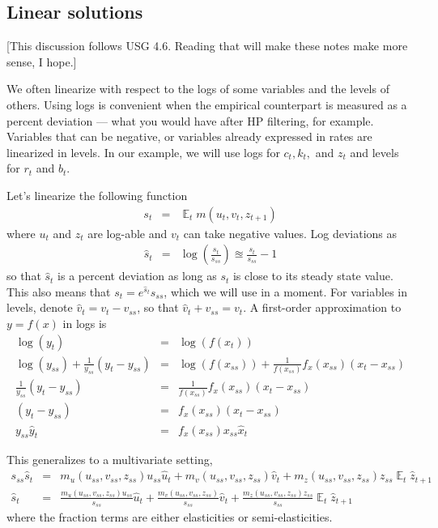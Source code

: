 \documentclass[11pt,pdftex,twoside,letterpaper]{exam}
\DeclareMathOperator{\EX}{\mathbb{E}}%
\begin{document}
\subsection{Linear solutions}
[This discussion follows USG 4.6. Reading that will make these notes make more sense, I hope.]

We often linearize with respect to the logs of some variables and the levels of others. Using logs is convenient when the empirical counterpart is measured as a percent deviation --- what you would have after HP filtering, for example. Variables that can be negative, or variables already expressed in rates are linearized in levels. In our example, we will use logs for $c_t, k_t,$ and  $z_t$ and levels for $r_t$ and $b_t$.

Let's linearize the following function
\begin{eqnarray}
  s_t &=& \EX_t m(u_t, v_t, z_{t+1}) \label{eq:tolin}
\end{eqnarray}
where $u_t$ and $z_t$ are log-able and $v_t$ can take negative values. Log deviations as
\begin{eqnarray}
  \hat{s}_t &=& \log\left(\frac{s_t}{s_{ss}}\right)\approxeq\frac{s_t}{s_{ss}}-1
\end{eqnarray}
so that $\hat{s}_t$ is a percent deviation as long as $s_t$ is close to its steady state value. This also means that $s_t=e^{\hat{s}_t}s_{ss}$, which we will use in a moment. For variables in levels, denote $\hat{v}_t=v_t-v_{ss}$, so that $\hat{v}_t+v_{ss}=v_t$. A first-order approximation to $y=f(x)$ in logs is
\begin{eqnarray}
  \log(y_t) &=& \log(f(x_t))\\
  \log(y_{ss})+\frac{1}{y_{ss}}(y_t-y_{ss})&=&\log(f(x_{ss}))+\frac{1}{f(x_{ss})}f_x(x_{ss})(x_t-x_{ss})\\
  \frac{1}{y_{ss}}(y_t-y_{ss})&=&\frac{1}{f(x_{ss})}f_x(x_{ss})(x_t-x_{ss})\\
  (y_t-y_{ss})&=&f_x(x_{ss})(x_t-x_{ss})\\
  y_{ss}\hat{y}_t&=&f_x(x_{ss})x_{ss}\hat{x}_t
\end{eqnarray}

This generalizes to a multivariate setting,
\begin{eqnarray}
  s_{ss}\hat{s}_t &=& m_u(u_{ss}, v_{ss}, z_{ss})u_{ss}\hat{u}_t+m_v(u_{ss}, v_{ss}, z_{ss})\hat{v}_t+m_z(u_{ss}, v_{ss}, z_{ss})z_{ss}\EX_t\hat{z}_{t+1}\\
  \hat{s}_t &=& \frac{m_u(u_{ss}, v_{ss}, z_{ss})u_{ss}}{s_{ss}}\hat{u}_t+\frac{m_v(u_{ss}, v_{ss}, z_{ss})}{s_{ss}}\hat{v}_t+\frac{m_z(u_{ss}, v_{ss}, z_{ss})z_{ss}}{s_{ss}}\EX_t\hat{z}_{t+1}
\end{eqnarray}
where the fraction terms are either elasticities or semi-elasticities.
\end{document}
